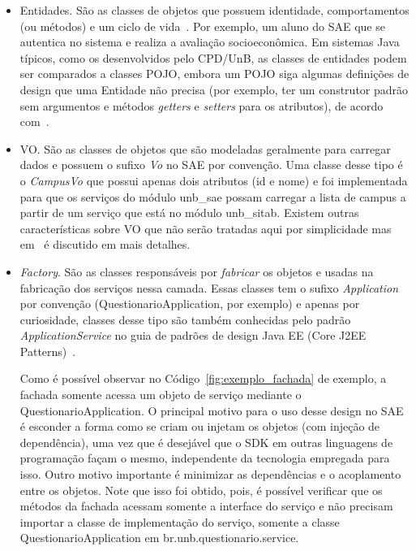 \begin{itemize}
\begin{itemize}
		\item Entidades. São as classes de objetos que possuem 
						 identidade, comportamentos (ou métodos) 
						 e um ciclo de vida~\cite{evans2004domain}.
						 Por exemplo, 
						 um aluno do \acrshort{SAE}
						 que se autentica no sistema e realiza
						 a avaliação socioeconômica. Em sistemas Java 
						 típicos, como os desenvolvidos pelo CPD/UnB,
						 as classes de entidades podem 
						 ser comparados a classes \acrfull{POJO}, 
						 embora	um \acrshort{POJO} siga
						 algumas definições de design
						 que uma Entidade não precisa
						 (por exemplo,	ter um construtor padrão
						 sem argumentos e 
						 métodos \textit{getters} e \textit{setters}
						 para os atributos), 			 
						 de acordo com~\cite{kalin2013java}.


		\item \acrfull{VO}. São as classes de objetos
						que são modeladas geralmente para 
						carregar dados e
						possuem o sufixo \emph{Vo}
						no \acrshort{SAE} por convenção.
						Uma classe desse tipo é o
						\emph{CampusVo} que
						possui apenas dois atributos (id e nome)
						e foi implementada para que os serviços 
						do módulo unb\_sae possam carregar a 
						lista de campus a partir de um serviço
						que está no módulo unb\_sitab. Existem
						outras características sobre \acrshort{VO}
						que não serão tratadas aqui por simplicidade
						mas em~\cite{fowler2002patterns} 
						é discutido em mais detalhes.
						
						

		\item \textit{Factory}. São as classes responsáveis
			por \emph{fabricar} os objetos e usadas
			na fabricação dos serviços nessa camada. 
			Essas classes tem 
			o sufixo \emph{Application} por convenção 
			(QuestionarioApplication, por exemplo)
			e apenas por curiosidade, classes desse tipo
			são também conhecidas pelo padrão
			\textit{ApplicationService} no guia de padrões
			de design Java EE (Core J2EE
			Patterns)~\cite{alur2003core}.
			
			Como é possível
			observar no Código~\ref{fig:exemplo_fachada} de exemplo,
			a fachada somente acessa um objeto de
			serviço mediante o QuestionarioApplication. 
			O principal motivo
			para o uso desse design
			no \acrshort{SAE} é esconder 
			a forma como se criam ou
			injetam os objetos (com injeção de dependência),
			uma vez que é desejável que o \acrshort{SDK}
			em outras linguagens de programação
			façam o mesmo,
			independente da tecnologia empregada para isso.
			Outro motivo importante é minimizar
			as dependências e o acoplamento entre os objetos. 
			Note que isso foi obtido, pois,
			é possível verificar que os métodos 
			da fachada acessam somente a interface 
			do serviço e não precisam importar 
			a classe de implementação do serviço,
			somente a classe QuestionarioApplication
			em br.unb.questionario.service.
		

\end{itemize}
\end{itemize}
